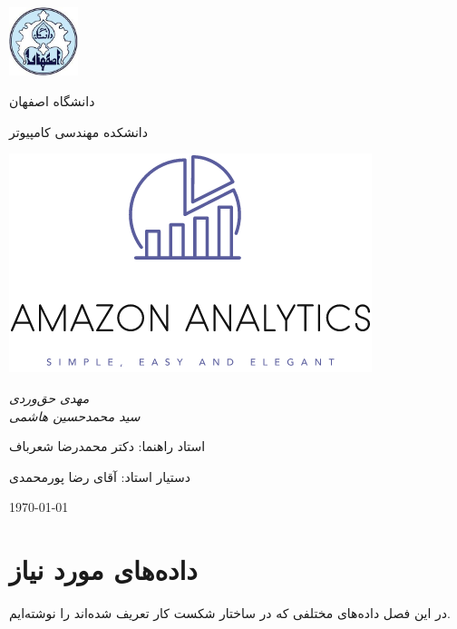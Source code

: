 \documentclass[11pt, oneside]{book}
\begin{document}
\frontmatter
\begin{titlepage}
\centering
\includegraphics[width=2cm, height=2cm]{../images/logo}\par
\vspace{2mm}            
دانشگاه اصفهان \par
دانشکده مهندسی کامپیوتر \par
    
\vspace{1cm}
\includegraphics{../images/alogo} \par
\vspace{3cm}
{\small\itshape                
مهدی حق‌وردی\\
سید محمدحسین هاشمی \par}
    
\vfill \par	\vfill
    
\vfill            
استاد راهنما:‌ دکتر محمدرضا شعرباف \par
دستیار استاد:‌ آقای رضا پورمحمدی
\vfill
    
{\large \today}
\end{titlepage}
\tableofcontents
\mainmatter

\chapter{داده‌های مورد نیاز}
در این فصل داده‌های مختلفی که در ساختار شکست کار تعریف شده‌اند را نوشته‌ایم.
\end{document}
